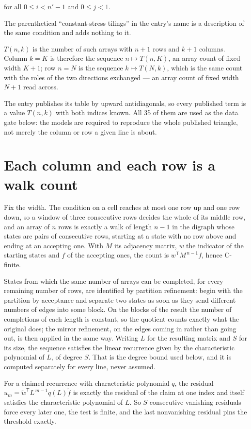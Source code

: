 \documentclass[11pt]{article}
\theoremstyle{definition}
\begin{document}
for all $0 \le i < n'-1$ and $0 \le j < 1$.

The parenthetical ``constant-stress tilings'' in the entry's name is a description of the same condition and adds nothing to it.

$T(n,k)$ is the number of such arrays with $n + 1$ rows and $k + 1$ columns. Column $k = K$ is therefore the sequence $n \mapsto T(n,K)$, an array count of fixed width $K + 1$; row $n = N$ is the sequence $k \mapsto T(N,k)$, which is the same count with the roles of the two directions exchanged --- an array count of fixed width $N + 1$ read across.

The entry publishes its table by upward antidiagonals, so every published term is a value $T(n,k)$ with both indices known. All 35 of them are used as the data gate below: the models are required to reproduce the whole published triangle, not merely the column or row a given line is about.

\section{Each column and each row is a walk count}

Fix the width. The condition on a cell reaches at most one row up and one row down, so a window of three consecutive rows decides the whole of its middle row, and an array of $n$ rows is exactly a walk of length $n-1$ in the digraph whose states are pairs of consecutive rows, starting at a state with no row above and ending at an accepting one. With $M$ its adjacency matrix, $w$ the indicator of the starting states and $f$ of the accepting ones, the count is $w^{\mathsf T}M^{\,n-1}f$, hence C-finite.

States from which the same number of arrays can be completed, for every remaining number of rows, are identified by partition refinement: begin with the partition by acceptance and separate two states as soon as they send different numbers of edges into some block. On the blocks of the result the number of completions of each length is constant, so the quotient counts exactly what the original does; the mirror refinement, on the edges coming in rather than going out, is then applied in the same way. Writing $L$ for the resulting matrix and $S$ for its size, the sequence satisfies the linear recurrence given by the characteristic polynomial of $L$, of degree $S$. That is the degree bound used below, and it is computed separately for every line, never assumed.

For a claimed recurrence with characteristic polynomial $q$, the residual $u_m = \tilde w^{\mathsf T}L^{\,m-1}q(L)\tilde f$ is exactly the residual of the claim at one index and itself satisfies the characteristic polynomial of $L$. So $S$ consecutive vanishing residuals force every later one, the test is finite, and the last nonvanishing residual pins the threshold exactly.
\end{document}
